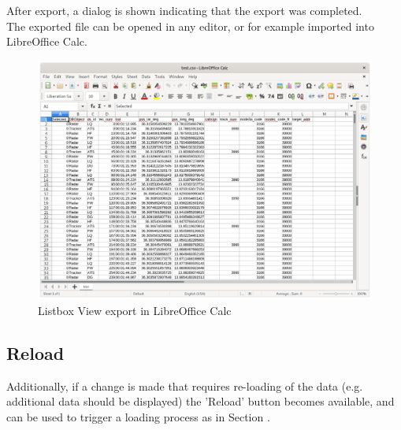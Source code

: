 After export, a dialog is shown indicating that the export was completed. \\

The exported file can be opened in any editor, or for example imported into LibreOffice Calc.

\begin{figure}[H]
    \hspace*{-2.5cm}
    \includegraphics[width=19cm]{figures/listbox_exported_calc.png}
  \caption{Listbox View export in LibreOffice Calc}
\end{figure}
 
\subsection{Reload}

Additionally, if a change is made that requires re-loading of the data (e.g. additional data should be displayed) the 'Reload' button becomes available, and can be used to trigger a loading process as in Section . 
